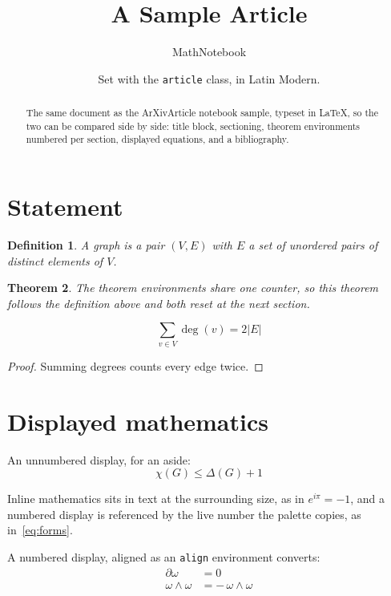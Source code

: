 \documentclass[11pt]{article}
\title{A Sample Article}
\author{MathNotebook}
\date{Set with the \texttt{article} class, in Latin Modern.}
\newtheorem{theorem}{Theorem}[section]
\newtheorem{definition}[theorem]{Definition}
\theoremstyle{remark}
\begin{document}
\maketitle

\begin{abstract}
The same document as the ArXivArticle notebook sample, typeset in LaTeX, so the
two can be compared side by side: title block, sectioning, theorem environments
numbered per section, displayed equations, and a bibliography.
\end{abstract}

\section{Statement}

\begin{definition}
A graph is a pair $(V,E)$ with $E$ a set of unordered pairs of distinct elements of $V$.
\end{definition}

\begin{theorem}
The theorem environments share one counter, so this theorem follows the definition
above and both reset at the next section.
\end{theorem}

\begin{equation}
  \sum_{v \in V} \deg(v) = 2\lvert E \rvert
\end{equation}

\begin{proof}
Summing degrees counts every edge twice.
\end{proof}

\section{Displayed mathematics}

An unnumbered display, for an aside:
\[
  \chi(G) \le \Delta(G) + 1
\]

Inline mathematics sits in text at the surrounding size, as in $e^{i\pi} = -1$, and a
numbered display is referenced by the live number the palette copies, as in~\eqref{eq:forms}.

A numbered display, aligned as an \texttt{align} environment converts:
\begin{align}
  \partial \omega &= 0 \label{eq:forms} \\
  \omega \wedge \omega &= -\, \omega \wedge \omega
\end{align}
\end{document}
